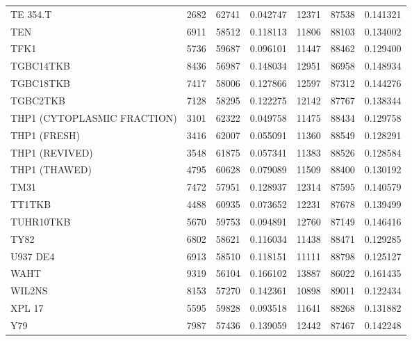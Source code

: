 \begin{tabular}{lrrrrrr}
                             TE 354.T &      2682 &    62741 &  0.042747 &     12371 &    87538 &  0.141321 \\
                                  TEN &      6911 &    58512 &  0.118113 &     11806 &    88103 &  0.134002 \\
                                 TFK1 &      5736 &    59687 &  0.096101 &     11447 &    88462 &  0.129400 \\
                            TGBC14TKB &      8436 &    56987 &  0.148034 &     12951 &    86958 &  0.148934 \\
                            TGBC18TKB &      7417 &    58006 &  0.127866 &     12597 &    87312 &  0.144276 \\
                             TGBC2TKB &      7128 &    58295 &  0.122275 &     12142 &    87767 &  0.138344 \\
          THP1 (CYTOPLASMIC FRACTION) &      3101 &    62322 &  0.049758 &     11475 &    88434 &  0.129758 \\
                         THP1 (FRESH) &      3416 &    62007 &  0.055091 &     11360 &    88549 &  0.128291 \\
                       THP1 (REVIVED) &      3548 &    61875 &  0.057341 &     11383 &    88526 &  0.128584 \\
                        THP1 (THAWED) &      4795 &    60628 &  0.079089 &     11509 &    88400 &  0.130192 \\
                                 TM31 &      7472 &    57951 &  0.128937 &     12314 &    87595 &  0.140579 \\
                               TT1TKB &      4488 &    60935 &  0.073652 &     12231 &    87678 &  0.139499 \\
                            TUHR10TKB &      5670 &    59753 &  0.094891 &     12760 &    87149 &  0.146416 \\
                                 TY82 &      6802 &    58621 &  0.116034 &     11438 &    88471 &  0.129285 \\
                             U937 DE4 &      6913 &    58510 &  0.118151 &     11111 &    88798 &  0.125127 \\
                                 WAHT &      9319 &    56104 &  0.166102 &     13887 &    86022 &  0.161435 \\
                               WIL2NS &      8153 &    57270 &  0.142361 &     10898 &    89011 &  0.122434 \\
                               XPL 17 &      5595 &    59828 &  0.093518 &     11641 &    88268 &  0.131882 \\
                                  Y79 &      7987 &    57436 &  0.139059 &     12442 &    87467 &  0.142248 \\
\bottomrule
\end{tabular}

